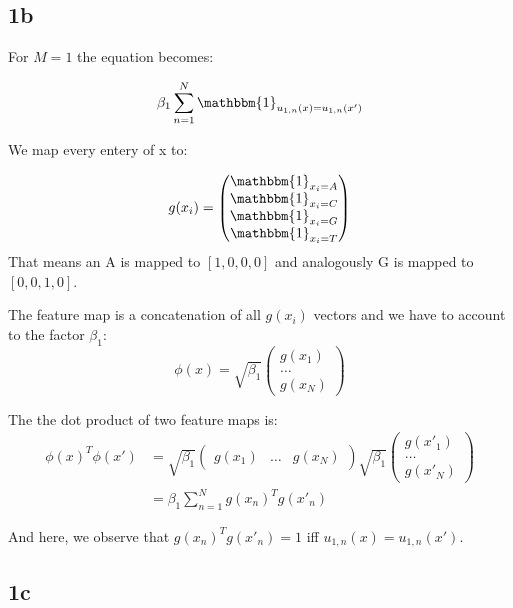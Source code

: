 
\subsection*{1b}

For $M=1$ the equation becomes:

\begin{equation}
    \beta_1 \sum_{n=1}^{N} \mathbbm{1}_{u_{1,n}(x) = u_{1,n}(x')}
\end{equation}

We map every entery of x to:

\begin{equation}
g(x_i) = \begin{pmatrix}
    \mathbbm{1}_{x_i = A} \\
    \mathbbm{1}_{x_i = C} \\
    \mathbbm{1}_{x_i = G} \\
    \mathbbm{1}_{x_i = T}
\end{pmatrix}
\end{equation}
That means an A is mapped to $[1, 0, 0, 0]$ and analogously G is mapped to $[0, 0, 1, 0]$.

The feature map is a concatenation of all $g(x_i)$ vectors and we have to account
to the factor $\beta_1$:
\begin{equation}
\phi(x) = \sqrt{\beta_1} \begin{pmatrix}
    g(x_1) \\
    \ldots \\
    g(x_N)
\end{pmatrix}
\end{equation}

The the dot product of two feature maps is:
\begin{align}
    \phi(x)^T \phi(x') &=
       \sqrt{\beta_1} \begin{pmatrix} g(x_1) & \ldots & g(x_N) \end{pmatrix}
       \sqrt{\beta_1}
       \begin{pmatrix}
            g(x'_1) \\
            \ldots \\
            g(x'_N)
       \end{pmatrix} \\
       & = \beta_1 \sum_{n=1}^{N} g(x_n)^T  g(x'_n)
\end{align}

And here, we observe that $g(x_n)^T g(x'_n) = 1$ iff $u_{1,n}(x) = u_{1,n}(x')$.

\subsection*{1c}

